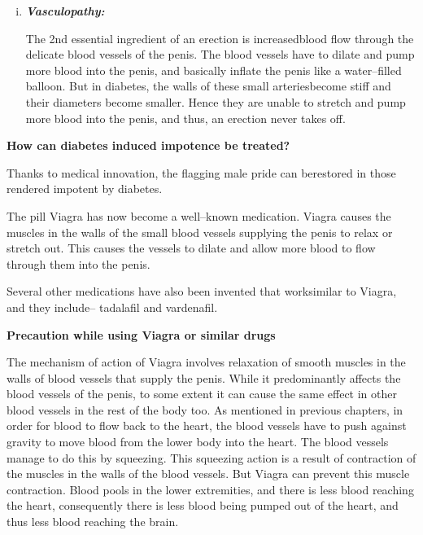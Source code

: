 \begin{enumerate}
\begin{enumerate}[i.]
 The autonomic nervous system is in charge of mobilizing the small blood vessels that supply the penis. It is only when these small blood vessels dilate and allow more blood flow through them into the chambers of the penis (corpora\break cavernosa), that an erection becomes possible. But diabetes affects the autonomic nervous system. Thus, even though a desire arises in our mind, the nerves are unable to translate this desire into an erection.

 \item \textbf{\textit{Vasculopathy:}}

 The 2nd essential ingredient of an erection is increased\break blood flow through the delicate blood vessels of the penis. The blood vessels have to dilate and pump more blood into the penis, and basically inflate the penis like a water–filled balloon. But in diabetes, the walls of these small arteries\break become stiff and their diameters become smaller. Hence they are unable to stretch and pump more blood into the penis, and thus, an erection never takes off.
\end{enumerate}
\end{enumerate}

\noindent\textbf{How can diabetes induced impotence be treated?}

Thanks to medical innovation, the flagging male pride can be\break restored in those rendered impotent by diabetes.

The pill Viagra has now become a well–known medication. Viagra causes the muscles in the walls of the small blood vessels supplying the penis to relax or stretch out. This causes the vessels to dilate and allow more blood to flow through them into the penis.

Several other medications have also been invented that work\break similar to Viagra, and they include– tadalafil and vardenafil.

\noindent\textbf{Precaution while using Viagra or similar drugs}

The mechanism of action of Viagra involves relaxation of smooth muscles in the walls of blood vessels that supply the penis. While it predominantly affects the blood vessels of the penis, to some extent it can cause the same effect in other blood vessels in the rest of the body too. As mentioned in previous chapters, in order for blood to flow back to the heart, the blood vessels have to push against gravity to move blood from the lower body into the heart. The blood vessels manage to do this by squeezing. This squeezing action is a result of contraction of the muscles in the walls of the blood vessels. But Viagra can prevent this muscle contraction. Blood pools in the lower extre\-mi\-ties, and there is less blood reaching the heart, consequently there is less blood being pumped out of the heart, and thus less blood reaching the brain.

